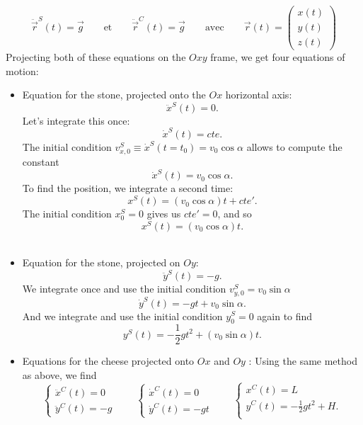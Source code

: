 \begin{enumerate}
\[
\ddot{\vec{r}}^S(t) = \vec{g} \qquad \textrm{et} \qquad \ddot{\vec{r}}^C(t) = \vec{g} \qquad \textrm{avec} \qquad \vec{r}(t)=\left(\begin{array}{c}x(t)\\y(t)\\z(t)\end{array}\right)
\]
Projecting both of these equations on the $Oxy$ frame, we get four equations of motion:\\
\begin{itemize}
\item Equation for the stone, projected onto the $Ox$ horizontal axis: 
\[
\ddot{x}^S(t) = 0.
\]
Let's integrate this once:
\[
\dot{x}^S(t) = cte.
\]
The initial condition  $v_{x,0}^S  \equiv \dot{x}^S(t=t_0) = v_0\cos\alpha$ allows to compute the constant
\[
\dot{x}^S(t) = v_0\cos\alpha.
\]
To find the position, we integrate a second time: 
\[
x^S(t)=(v_0\cos\alpha) t + cte'.
\]
The initial condition $x_0^S = 0$ gives us $cte' = 0$, and so
\[
x^S(t)=(v_0\cos\alpha) t.
\]\\
\item Equation for the stone, projected on $Oy$:
\[
\ddot{y}^S(t) = -g.
\]
We integrate once and use the initial condition $v_{y,0}^S = v_0\sin\alpha$
\[
\dot{y}^S(t) = -gt + v_0\sin\alpha.
\]
And we integrate and use the initial condition $y_0^S = 0$ again to find
\[
y^S(t)= -\frac{1}{2}gt^2 + (v_0\sin\alpha) t.
\]
\item Equations for the cheese projected onto $Ox$ and $Oy$ :
Using the same method as above, we find
\begin{displaymath}
\left\{ \begin{array}{l}
\ddot{x}^C(t) = 0 \\
\ddot{y}^C(t) = -g 
\end{array}\right.\qquad
\left\{ \begin{array}{l}
\dot{x}^C(t) = 0 \\
\dot{y}^C(t) = -gt
\end{array}\right.\qquad
\left\{ \begin{array}{l}
{x}^C(t) = L \\
{y}^C(t) = -\frac{1}{2}gt^2 +H. \\
\end{array}\right.
\end{displaymath}\\
\end{itemize} 


\end{enumerate}
